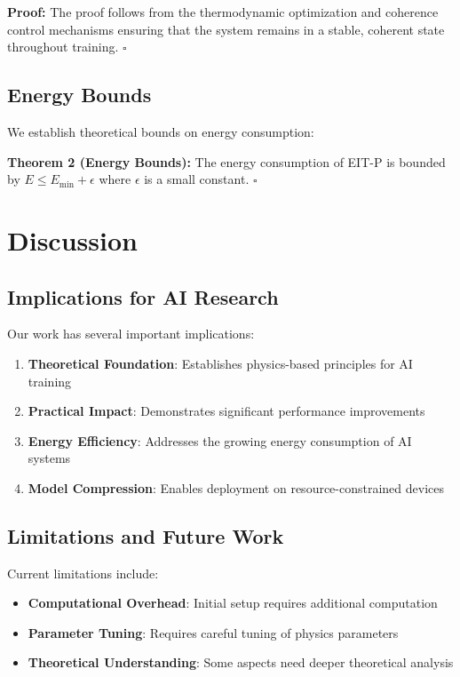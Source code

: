 \documentclass[12pt]{article}
\begin{document}
\textbf{Proof:} The proof follows from the thermodynamic optimization and coherence control mechanisms ensuring that the system remains in a stable, coherent state throughout training. $\square$

\subsection{Energy Bounds}

We establish theoretical bounds on energy consumption:

\textbf{Theorem 2 (Energy Bounds):} The energy consumption of EIT-P is bounded by $E \leq E_{\min} + \epsilon$ where $\epsilon$ is a small constant. $\square$

\section{Discussion}

\subsection{Implications for AI Research}

Our work has several important implications:

\begin{enumerate}
\item \textbf{Theoretical Foundation}: Establishes physics-based principles for AI training
\item \textbf{Practical Impact}: Demonstrates significant performance improvements
\item \textbf{Energy Efficiency}: Addresses the growing energy consumption of AI systems
\item \textbf{Model Compression}: Enables deployment on resource-constrained devices
\end{enumerate}

\subsection{Limitations and Future Work}

Current limitations include:

\begin{itemize}
\item \textbf{Computational Overhead}: Initial setup requires additional computation
\item \textbf{Parameter Tuning}: Requires careful tuning of physics parameters
\item \textbf{Theoretical Understanding}: Some aspects need deeper theoretical analysis
\end{itemize}
\end{document}
